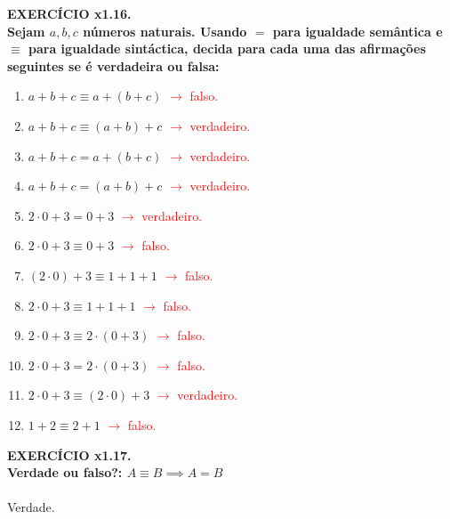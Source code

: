 \documentclass[a4paper, 12pt]{article}
\begin{document}
\noindent \textbf{EXERCÍCIO x1.16. \\
Sejam $a, b, c$ números naturais. Usando $=$ para igualdade semântica e $\equiv$ para igualdade
sintáctica, decida para cada uma das afirmações seguintes se é verdadeira ou falsa:}

\begin{enumerate}[($i$)]
    \item $a + b + c \equiv a + (b + c)$ \textcolor{red}{$\rightarrow$ falso.}
    \item $a + b + c \equiv (a + b) + c$ \textcolor{red}{$\rightarrow$ verdadeiro.}
    \item $a + b + c = a + (b + c)$ \textcolor{red}{$\rightarrow$ verdadeiro.}
    \item $a + b + c = (a + b) + c$ \textcolor{red}{$\rightarrow$ verdadeiro.}
    \item $2 \cdot 0 + 3 = 0 + 3$ \textcolor{red}{$\rightarrow$ verdadeiro.}
    \item $2 \cdot 0 + 3 \equiv 0 + 3$ \textcolor{red}{$\rightarrow$ falso.}
    \item $(2 \cdot 0) + 3 \equiv 1 + 1 + 1$ \textcolor{red}{$\rightarrow$ falso.}
    \item $2 \cdot 0 + 3 \equiv 1 + 1 + 1$ \textcolor{red}{$\rightarrow$ falso.}
    \item $2 \cdot 0 + 3 \equiv 2 \cdot (0 + 3)$ \textcolor{red}{$\rightarrow$ falso.}
    \item $2 \cdot 0 + 3 = 2 \cdot (0 + 3)$ \textcolor{red}{$\rightarrow$ falso.}
    \item $2 \cdot 0 + 3 \equiv (2 \cdot 0) + 3$ \textcolor{red}{$\rightarrow$ verdadeiro.}
    \item $1 + 2 \equiv 2 + 1$ \textcolor{red}{$\rightarrow$ falso.}
\end{enumerate}

\noindent \textbf{EXERCÍCIO x1.17. \\
Verdade ou falso?: $A \equiv B \implies A = B$
} \\ \\
Verdade. \\ \\
\end{document}
